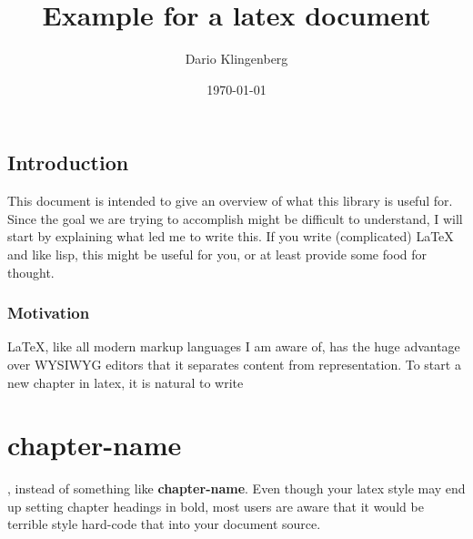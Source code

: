 \documentclass[11pt]{article}
\author{Dario Klingenberg}
\date{\today}
\title{Example for a latex document}
\begin{document}
\maketitle

\section{Introduction}
\label{sec:orgd7fa01b}
  This document is intended to give an overview of what this library is useful for.
Since the goal we are trying to accomplish might be difficult to understand, 
I will start by explaining what led me to write this. 
If you write (complicated) \LaTeX{} and like lisp, this might be useful for you, or 
at least provide some food for thought.
\subsection{Motivation}
\label{sec:org18802e9}
\LaTeX{}, like all modern markup languages I am aware of, has the huge advantage over
WYSIWYG editors that it separates content from representation. 
To start a new chapter in latex, it is natural to write \chapter{chapter-name},
instead of something like \textbf{chapter-name}. Even though your latex style 
may end up setting chapter headings in bold, most users are aware that
it would be terrible style hard-code that into your document source. 
\end{document}
